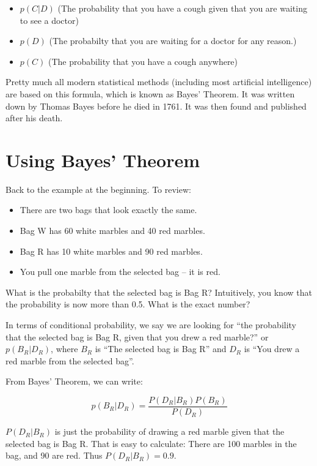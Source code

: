 \begin{itemize}
\item $p(C | D)$ (The probability that you have a cough given that you are waiting to see a doctor)
\item $p(D)$ (The probabilty that you are waiting for a doctor for any reason.)
\item $p(C)$ (The probability that you have a cough anywhere)
\end{itemize}

Pretty much all modern statistical methods (including most artificial
intelligence) are based on this formula, which is known as Bayes'
Theorem. It was written down by Thomas Bayes before he died in
1761. It was then found and published after his death.

\section{Using Bayes' Theorem}

Back to the example at the beginning. To review:

\begin{itemize}
\item There are two bags that look exactly the same.
\item Bag W has 60 white marbles and 40 red marbles.
\item Bag R has 10 white marbles and 90 red marbles.
\item You pull one marble from the selected bag -- it is red.
\end{itemize}

What is the probabilty that the selected bag is Bag R? Intuitively,
you know that the probability is now more than 0.5. What is the exact
number?

In terms of conditional probability, we say we are looking for ``the probability
that the selected bag is Bag R, given that you drew a red marble?'' or
$p(B_R | D_R)$, where $B_R$ is ``The selected bag is Bag R'' and $D_R$ is
``You drew a red marble from the selected bag''.

From Bayes' Theorem, we can write:

$$p(B_R | D_R) = \frac{ P(D_R | B_R) P(B_R) } {P(D_R)}$$

$P(D_R | B_R)$ is just the probability of drawing a red marble given that the
selected bag is Bag R. That is easy to calculate: There are 100
marbles in the bag, and 90 are red. Thus $P(D_R | B_R) = 0.9$.

